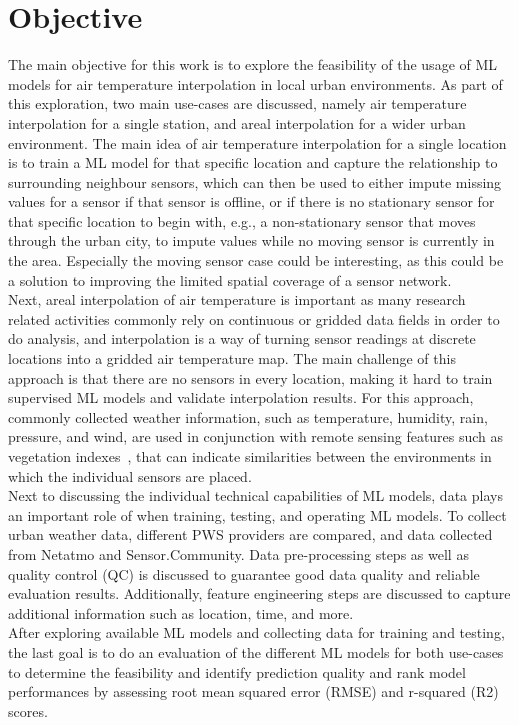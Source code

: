 \section{Objective}

The main objective for this work is to explore the feasibility of the usage of ML models for air temperature interpolation in local urban environments. As part of this exploration, two main use-cases are discussed, namely air temperature interpolation for a single station, and areal interpolation for a wider urban environment. The main idea of air temperature interpolation for a single location is to train a ML model for that specific location and capture the relationship to surrounding neighbour sensors, which can then be used to either impute missing values for a sensor if that sensor is offline, or if there is no stationary sensor for that specific location to begin with, e.g., a non-stationary sensor that moves through the urban city, to impute values while no moving sensor is currently in the area. Especially the moving sensor case could be interesting, as this could be a solution to improving the limited spatial coverage of a sensor network.\\
Next, areal interpolation of air temperature is important as many research related activities commonly rely on continuous or gridded data fields in order to do analysis, and interpolation is a way of turning sensor readings at discrete locations into a gridded air temperature map. The main challenge of this approach is that there are no sensors in every location, making it hard to train supervised ML models and validate interpolation results. For this approach, commonly collected weather information, such as temperature, humidity, rain, pressure, and wind, are used in conjunction with remote sensing features such as vegetation indexes~\cite{alonso2020new}, that can indicate similarities between the environments in which the individual sensors are placed.\\
Next to discussing the individual technical capabilities of ML models, data plays an important role of when training, testing, and operating ML models. To collect urban weather data, different PWS providers are compared, and data collected from Netatmo and Sensor.Community. Data pre-processing steps as well as quality control (QC) is discussed to guarantee good data quality and reliable evaluation results. Additionally, feature engineering steps are discussed to capture additional information such as location, time, and more.\\
After exploring available ML models and collecting data for training and testing, the last goal is to do an evaluation of the different ML models for both use-cases to determine the feasibility and identify prediction quality and rank model performances by assessing root mean squared error (RMSE) and r-squared (R2) scores.

